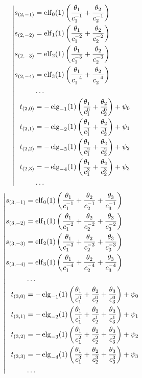 \begin{equation*} \left| \begin{aligned}
s_{(2,-1)} &=
  \elf_0(1) \left(
  \frac{\theta_1}{c_1^{-1}}
+ \frac{\theta_2}{c_2^{-1}} \right) \\
%
s_{(2,-2)} &=
  \elf_1(1) \left(
  \frac{\theta_1}{c_1^{-2}}
+ \frac{\theta_2}{c_2^{-2}} \right) \\
%
s_{(2,-3)} &=
  \elf_2(1) \left(
  \frac{\theta_1}{c_1^{-3}}
+ \frac{\theta_2}{c_2^{-3}} \right) \\
%
s_{(2,-4)} &=
  \elf_3(1) \left(
  \frac{\theta_1}{c_1^{-4}}
+ \frac{\theta_2}{c_2^{-4}} \right) \\
%
&\ldots \\
%
t_{(2,0)} &=
- \elg_{-1}(1) \left(
  \frac{\theta_1}{c_1^0}
+ \frac{\theta_2}{c_2^0} \right)
+ \psi_0 \\
%
t_{(2,1)} &=
- \elg_{-2}(1) \left(
  \frac{\theta_1}{c_1^1}
+ \frac{\theta_2}{c_2^1} \right)
+ \psi_1 \\
%
t_{(2,2)} &=
- \elg_{-3}(1) \left(
  \frac{\theta_1}{c_1^2}
+ \frac{\theta_2}{c_2^2} \right)
+ \psi_2 \\
%
t_{(2,3)} &=
- \elg_{-4}(1) \left(
  \frac{\theta_1}{c_1^3}
+ \frac{\theta_2}{c_2^3} \right)
+ \psi_3 \\
%
&\ldots \\
\end{aligned} \right. \end{equation*}
%
\begin{equation*} \left| \begin{aligned}
%
s_{(3,-1)} &=
  \elf_0(1) \left(
  \frac{\theta_1}{c_1^{-1}}
+ \frac{\theta_2}{c_2^{-1}}
+ \frac{\theta_3}{c_3^{-1}} \right) \\
%
s_{(3,-2)} &=
  \elf_1(1) \left(
  \frac{\theta_1}{c_1^{-2}}
+ \frac{\theta_2}{c_2^{-2}}
+ \frac{\theta_3}{c_3^{-2}} \right) \\
%
s_{(3,-3)} &=
  \elf_2(1) \left(
  \frac{\theta_1}{c_1^{-3}}
+ \frac{\theta_2}{c_2^{-3}}
+ \frac{\theta_3}{c_3^{-3}} \right) \\
%
s_{(3,-4)} &=
  \elf_3(1) \left(
  \frac{\theta_1}{c_1^{-4}}
+ \frac{\theta_2}{c_2^{-4}}
+ \frac{\theta_3}{c_3^{-4}} \right) \\
%
&\ldots \\
%
t_{(3,0)} &=
- \elg_{-1}(1) \left(
  \frac{\theta_1}{c_1^0}
+ \frac{\theta_2}{c_2^0}
+ \frac{\theta_3}{c_3^0} \right)
+ \psi_0 \\
%
t_{(3,1)} &=
- \elg_{-2}(1) \left(
  \frac{\theta_1}{c_1^1}
+ \frac{\theta_2}{c_2^1}
+ \frac{\theta_3}{c_3^1} \right)
+ \psi_1 \\
%
t_{(3,2)} &=
- \elg_{-3}(1) \left(
  \frac{\theta_1}{c_1^2}
+ \frac{\theta_2}{c_2^2}
+ \frac{\theta_3}{c_3^2} \right)
+ \psi_2 \\
%
t_{(3,3)} &=
- \elg_{-4}(1) \left(
  \frac{\theta_1}{c_1^3}
+ \frac{\theta_2}{c_2^3}
+ \frac{\theta_3}{c_3^3} \right)
+ \psi_3 \\
%
&\ldots \\
\end{aligned} \right. \end{equation*}
